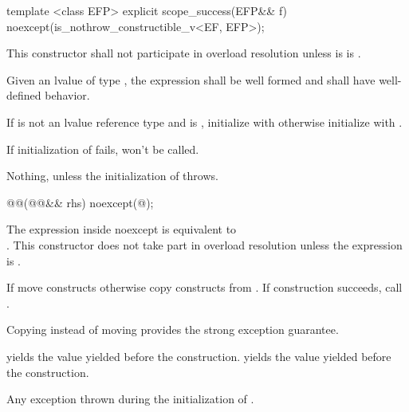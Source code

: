 \documentclass[ebook,11pt,article]{memoir}
\begin{document}
\begin{itemdecl}
template <class EFP>
explicit
scope_success(EFP&& f) noexcept(is_nothrow_constructible_v<EF, EFP>);
\end{itemdecl}

\begin{itemdescr}
\pnum
\remarks This constructor shall not participate in overload resolution unless 
 is 
 is .

\pnum
\requires Given an lvalue  of type , the expression  shall be well formed and shall have well-defined behavior.

\pnum
\effects If  is not an lvalue reference type and  is , initialize   with  otherwise initialize  with . 
\begin{note}
If initialization of  fails,  won't be called.
\end{note}

\pnum
\throws Nothing, unless the initialization of  throws.
\end{itemdescr}

\begin{itemdecl}
@@(@@&& rhs) noexcept(@\seebelow@);
\end{itemdecl}

\begin{itemdescr}
\pnum
\remarks 
The expression inside noexcept is equivalent to \\
.
This constructor does not take part in overload resolution unless the expression 
is .

\pnum
\effects %
If  move constructs otherwise copy constructs  from . If construction succeeds, call .
\begin{note}
Copying instead of moving provides the strong exception guarantee.
\end{note}


\pnum
\postconditions
{} yields the value  yielded before the construction. 
 yields the value  yielded before the construction.

\pnum
\throws Any exception thrown during the initialization of .

\end{itemdescr}
\end{document}
